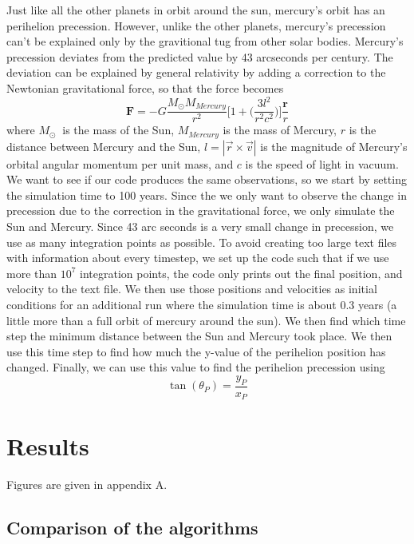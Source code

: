 \documentclass{article}
\begin{document}
\begin{multicols}{2}
Just like all the other planets in orbit around the sun, mercury's orbit has an perihelion precession. However, unlike the other planets, mercury's precession can't be explained only by the gravitional tug from other solar bodies. Mercury's precession deviates from the predicted value by 43 arcseconds per century. The deviation can be explained by general relativity by adding a correction to the Newtonian gravitational force, so that the force becomes
\begin{equation}
\mathbf{F}=-G\frac{M_{\odot}M_{Mercury}}{r^2}\Bigg[1+\Bigg(\frac{3l^2}{r^2c^2}\bigg)\bigg]\frac{\mathbf{r}}{r} \label{eq:relcor}
\end{equation}
where $M_\odot\ $ is the mass of the Sun, $M_{Mercury}$ is the mass of Mercury, $r$ is the distance between Mercury and the Sun, $l = |\vec{r} \times \vec{v}|$ is the magnitude of Mercury’s orbital angular momentum per unit mass, and $c$ is the speed of light in vacuum. We want to see if our code produces the same observations, so we start by setting the simulation time to 100 years. Since the we only want to observe the change in precession due to the correction in the gravitational force, we only simulate the Sun and Mercury. Since 43 arc seconds is a very small change in precession, we use as many integration points as possible. To avoid creating too large text files with information about every timestep, we set up the code such that if we use more than $10^7$ integration points, the code only prints out the final position, and velocity to the text file. We then use those positions and velocities as initial conditions for an additional run where the simulation time is about 0.3 years (a little more than a full orbit of mercury around the sun). We then find which time step the minimum distance between the Sun and Mercury took place. We then use this time step to find how much the y-value of the perihelion position has changed. Finally, we can use this value to find the perihelion precession using
\begin{equation}
\tan(\theta_P) = \frac{y_P}{x_P}
\end{equation}

\section{Results}

Figures are given in appendix A. 

\subsection{Comparison of the algorithms}


\end{multicols}
\end{document}
